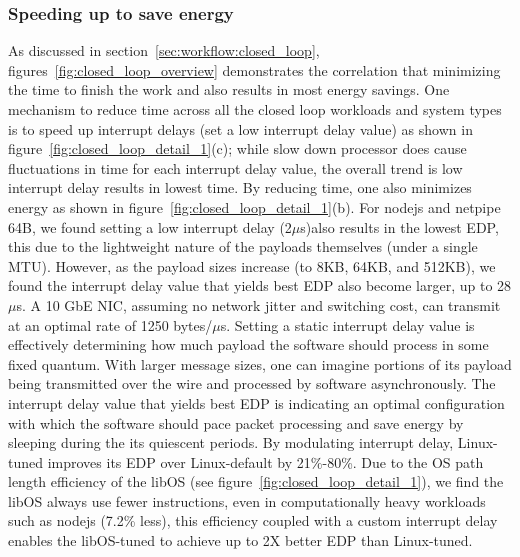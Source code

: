 
\subsubsection{Speeding up to save energy}
\label{sec:closed_loop:speedup}
As discussed in section~\ref{sec:workflow:closed_loop}, figures~\ref{fig:closed_loop_overview} demonstrates the correlation that minimizing the time to finish the work and also results in most energy savings. One mechanism to reduce time across all the closed loop workloads and system types is to speed up interrupt delays (set a low interrupt delay value) as shown in figure~\ref{fig:closed_loop_detail_1}(c); while slow down processor does cause fluctuations in time for each interrupt delay value, the overall trend is low interrupt delay results in lowest time. By reducing time, one also minimizes energy as shown in figure~\ref{fig:closed_loop_detail_1}(b). For nodejs and netpipe 64B, we found setting a low interrupt delay (2$\mu$s)also results in the lowest EDP, this due to the lightweight nature of the payloads themselves (under a single MTU). However, as the payload sizes increase (to 8KB, 64KB, and 512KB), we found the interrupt delay value that yields best EDP also become larger, up to 28$\mu$s. A 10 GbE NIC, assuming no network jitter and switching cost, can transmit at an optimal rate of 1250 bytes/$\mu$s. Setting a static interrupt delay value is effectively determining how much payload the software should process in some fixed quantum. With larger message sizes, one can imagine portions of its payload being transmitted over the wire and processed by software asynchronously. The interrupt delay value that yields best EDP is indicating an optimal configuration with which the software should pace packet processing and save energy by sleeping during the its quiescent periods. By modulating interrupt delay, Linux-tuned improves its EDP over Linux-default by 21\%-80\%. Due to the OS path length efficiency of the libOS (see figure~\ref{fig:closed_loop_detail_1}), we find the libOS always use fewer instructions, even in computationally heavy workloads such as nodejs (7.2\% less), this efficiency coupled with a custom interrupt delay enables the libOS-tuned to achieve up to 2X better EDP than Linux-tuned.

